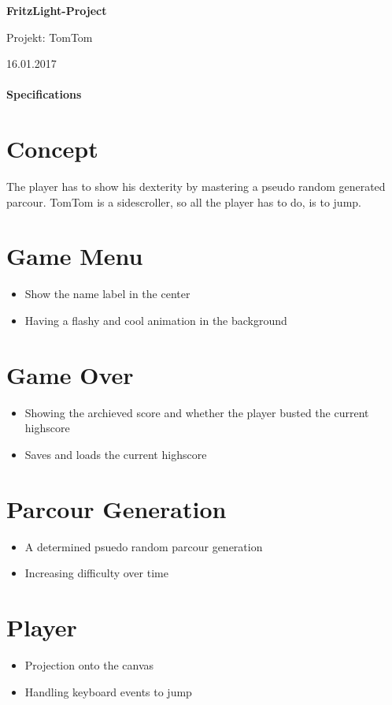 \documentclass[a4paper, 10pt]{article}
\begin{document}
\begin{center}


{\Large\bf FritzLight-Project}\bigskip

{\large Projekt: TomTom}\medskip

{\normalsize 16.01.2017}\medskip
\end{center} 

\paragraph {\Large\bf  Specifications} 
\section{Concept}
The player has to show his dexterity by mastering a pseudo random generated parcour. TomTom is a sidescroller, so all the player has to do, is to jump.

\section{Game Menu}
\begin{itemize}
\item Show the name label in the center
\item Having a flashy and cool animation in the background
\end{itemize}

\section{Game Over}
\begin{itemize}
\item Showing the archieved score and whether the player busted the current highscore
\item Saves and loads the current highscore
\end{itemize}

\section{Parcour Generation}
\begin{itemize}
\item A determined psuedo random parcour generation
\item Increasing difficulty over time
\end{itemize}
 
\section{Player}
\begin{itemize}
\item Projection onto the canvas
\item Handling keyboard events to jump
\end{itemize}
\end{document}
